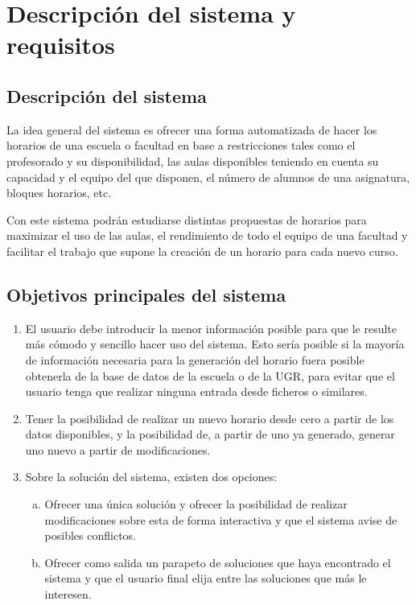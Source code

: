 \chapter{Descripción del sistema y requisitos}

\section{Descripción del sistema}

La idea general del sistema es ofrecer una forma automatizada de hacer los horarios de una escuela o facultad en base a restricciones tales como el profesorado y su disponibilidad, las aulas disponibles teniendo en cuenta su capacidad y el equipo del que disponen, el número de alumnos de una asignatura, bloques horarios, etc. 

Con este sistema podrán estudiarse distintas propuestas de horarios para maximizar el uso de las aulas, el rendimiento de todo el equipo de una facultad y facilitar el trabajo que supone la creación de un horario para cada nuevo curso.

\section{Objetivos principales del sistema}

\begin{enumerate}[OBJ-1]
    \item El usuario debe introducir la menor información posible para que le resulte más cómodo y sencillo hacer uso del sistema. Esto sería posible si la mayoría de información necesaria para la generación del horario fuera posible obtenerla de la base de datos de la escuela o de la UGR, para evitar que el usuario tenga que realizar ninguna entrada desde ficheros o similares.
    
    \item Tener la posibilidad de realizar un nuevo horario desde cero a partir de los datos disponibles, y la posibilidad de, a partir de uno ya generado, generar uno nuevo a partir de modificaciones.

    \item Sobre la solución del sistema, existen dos opciones:
    \begin{enumerate}[a)]
        \item Ofrecer una única solución y ofrecer la posibilidad de realizar modificaciones sobre esta de forma interactiva y que el sistema avise de posibles conflictos.
        \item Ofrecer como salida un parapeto de soluciones que haya encontrado el sistema y que el usuario final elija entre las soluciones que más le interesen.
    \end{enumerate}
\end{enumerate}

